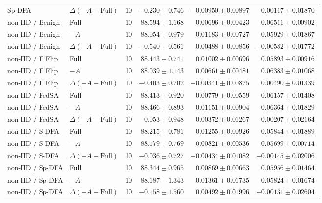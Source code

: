 \begin{table}[t]
\begin{tabular}{llrrrr}
Sp-DFA & $\Delta(-A-\mathrm{Full})$ & 10 & $-0.230 \pm 0.746$ & $-0.00950 \pm 0.00897$ & $0.00117 \pm 0.01870$ \\
non-IID / Benign & Full & 10 & $88.594 \pm 1.168$ & $0.00696 \pm 0.00423$ & $0.06511 \pm 0.00902$ \\
non-IID / Benign & $-A$ & 10 & $88.054 \pm 0.979$ & $0.01183 \pm 0.00727$ & $0.05929 \pm 0.01867$ \\
non-IID / Benign & $\Delta(-A-\mathrm{Full})$ & 10 & $-0.540 \pm 0.561$ & $0.00488 \pm 0.00856$ & $-0.00582 \pm 0.01772$ \\
non-IID / F Flip & Full & 10 & $88.443 \pm 0.741$ & $0.01002 \pm 0.00696$ & $0.05893 \pm 0.00916$ \\
non-IID / F Flip & $-A$ & 10 & $88.039 \pm 1.143$ & $0.00661 \pm 0.00481$ & $0.06383 \pm 0.01068$ \\
non-IID / F Flip & $\Delta(-A-\mathrm{Full})$ & 10 & $-0.403 \pm 0.702$ & $-0.00341 \pm 0.00875$ & $0.00490 \pm 0.01339$ \\
non-IID / FedSA & Full & 10 & $88.413 \pm 0.920$ & $0.00779 \pm 0.00559$ & $0.06157 \pm 0.01408$ \\
non-IID / FedSA & $-A$ & 10 & $88.466 \pm 0.893$ & $0.01151 \pm 0.00904$ & $0.06364 \pm 0.01829$ \\
non-IID / FedSA & $\Delta(-A-\mathrm{Full})$ & 10 & $0.053 \pm 0.948$ & $0.00372 \pm 0.01267$ & $0.00207 \pm 0.02164$ \\
non-IID / S-DFA & Full & 10 & $88.215 \pm 0.781$ & $0.01255 \pm 0.00926$ & $0.05844 \pm 0.01889$ \\
non-IID / S-DFA & $-A$ & 10 & $88.179 \pm 0.769$ & $0.00821 \pm 0.00536$ & $0.05699 \pm 0.00714$ \\
non-IID / S-DFA & $\Delta(-A-\mathrm{Full})$ & 10 & $-0.036 \pm 0.727$ & $-0.00434 \pm 0.01082$ & $-0.00145 \pm 0.02006$ \\
non-IID / Sp-DFA & Full & 10 & $88.344 \pm 0.965$ & $0.00869 \pm 0.00663$ & $0.05956 \pm 0.01464$ \\
non-IID / Sp-DFA & $-A$ & 10 & $88.187 \pm 1.343$ & $0.01361 \pm 0.01735$ & $0.05824 \pm 0.01674$ \\
non-IID / Sp-DFA & $\Delta(-A-\mathrm{Full})$ & 10 & $-0.158 \pm 1.560$ & $0.00492 \pm 0.01996$ & $-0.00131 \pm 0.02604$ \\
\bottomrule
\end{tabular}
\end{table}

